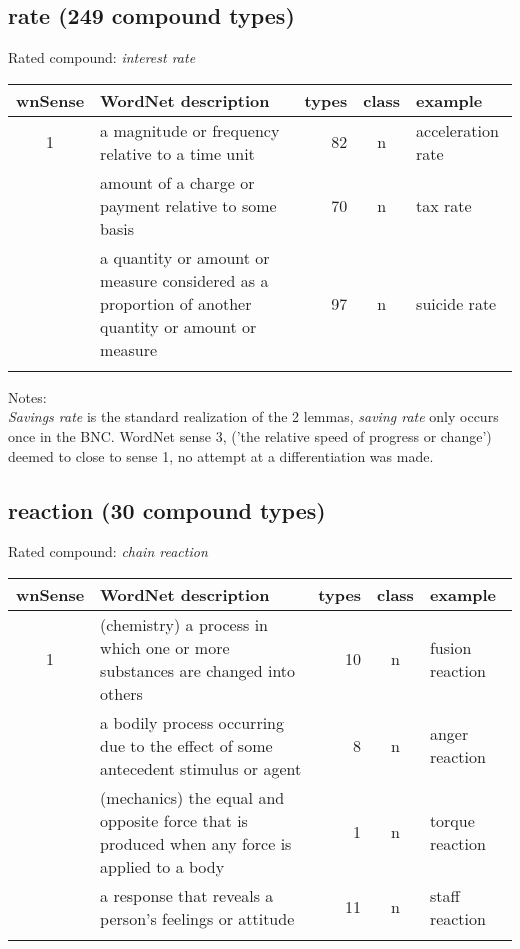 \subsection{rate     (249 compound types)}
Rated compound: \emph{interest rate}
\vspace*{-.2cm}

\begin{longtable}{c>{\raggedright\arraybackslash}p{5cm}rc>{\raggedright\arraybackslash}p{2cm}}\lsptoprule
{\small wnSense}&WordNet description&types&class&example\\\midrule
1&a magnitude or frequency relative to a time unit&82&n&acceleration rate\\\tablevspace
2&amount of a charge or payment relative to some basis&70&n&tax rate\\\tablevspace
4&a quantity or amount or measure considered as a proportion of another quantity or amount or measure&97&n&suicide rate\\\lspbottomrule
\end{longtable}

\noindent
Notes:\\
\emph{Savings rate} is the standard realization of the 2 lemmas, \emph{saving rate} only occurs once in the BNC. WordNet sense 3, ('the relative speed of progress or change') deemed to close to sense 1, no attempt at a differentiation was made.

\subsection{reaction  (30 compound types)}
Rated compound: \emph{chain reaction}

\vspace*{1ex}

\noindent
\begin{longtable}{c>{\raggedright\arraybackslash}p{5cm}rc>{\raggedright\arraybackslash}p{2cm}}\lsptoprule
{\small wnSense}&WordNet description&types&class&example\\\midrule
1&(chemistry) a process in which one or more substances are changed into others&10&n&fusion reaction\\\tablevspace
3&a bodily process occurring due to the effect of some antecedent stimulus or agent&8&n&anger reaction\\\tablevspace
4&(mechanics) the equal and opposite force that is produced when any force is applied to a body&1&n&torque reaction\\\tablevspace
5&a response that reveals a person's feelings or attitude&11&n&staff reaction\\\lspbottomrule
\end{longtable}

